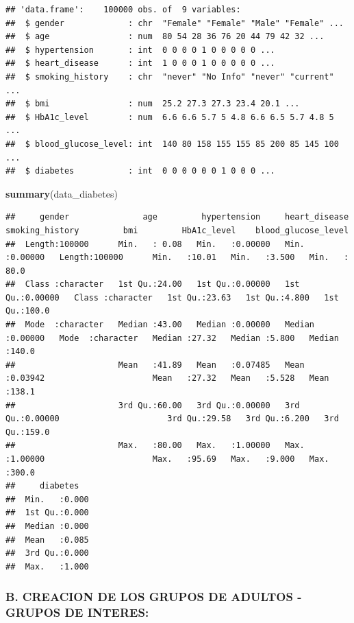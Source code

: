 \documentclass[
]{article}
\newenvironment{Shaded}{\begin{snugshade}}{\end{snugshade}}
\newcommand{\FunctionTok}[1]{\textcolor[rgb]{0.13,0.29,0.53}{\textbf{#1}}}
\newcommand{\NormalTok}[1]{#1}
\begin{document}
\begin{verbatim}
## 'data.frame':    100000 obs. of  9 variables:
##  $ gender             : chr  "Female" "Female" "Male" "Female" ...
##  $ age                : num  80 54 28 36 76 20 44 79 42 32 ...
##  $ hypertension       : int  0 0 0 0 1 0 0 0 0 0 ...
##  $ heart_disease      : int  1 0 0 0 1 0 0 0 0 0 ...
##  $ smoking_history    : chr  "never" "No Info" "never" "current" ...
##  $ bmi                : num  25.2 27.3 27.3 23.4 20.1 ...
##  $ HbA1c_level        : num  6.6 6.6 5.7 5 4.8 6.6 6.5 5.7 4.8 5 ...
##  $ blood_glucose_level: int  140 80 158 155 155 85 200 85 145 100 ...
##  $ diabetes           : int  0 0 0 0 0 0 1 0 0 0 ...
\end{verbatim}

\begin{Shaded}
\begin{Highlighting}[]
\FunctionTok{summary}\NormalTok{(data\_diabetes)}
\end{Highlighting}
\end{Shaded}

\begin{verbatim}
##     gender               age         hypertension     heart_disease     smoking_history         bmi         HbA1c_level    blood_glucose_level
##  Length:100000      Min.   : 0.08   Min.   :0.00000   Min.   :0.00000   Length:100000      Min.   :10.01   Min.   :3.500   Min.   : 80.0      
##  Class :character   1st Qu.:24.00   1st Qu.:0.00000   1st Qu.:0.00000   Class :character   1st Qu.:23.63   1st Qu.:4.800   1st Qu.:100.0      
##  Mode  :character   Median :43.00   Median :0.00000   Median :0.00000   Mode  :character   Median :27.32   Median :5.800   Median :140.0      
##                     Mean   :41.89   Mean   :0.07485   Mean   :0.03942                      Mean   :27.32   Mean   :5.528   Mean   :138.1      
##                     3rd Qu.:60.00   3rd Qu.:0.00000   3rd Qu.:0.00000                      3rd Qu.:29.58   3rd Qu.:6.200   3rd Qu.:159.0      
##                     Max.   :80.00   Max.   :1.00000   Max.   :1.00000                      Max.   :95.69   Max.   :9.000   Max.   :300.0      
##     diabetes    
##  Min.   :0.000  
##  1st Qu.:0.000  
##  Median :0.000  
##  Mean   :0.085  
##  3rd Qu.:0.000  
##  Max.   :1.000
\end{verbatim}

\hypertarget{b.-creacion-de-los-grupos-de-adultos---grupos-de-interes}{%
\subsubsection{\texorpdfstring{\textbf{B. CREACION DE LOS GRUPOS DE
ADULTOS - GRUPOS DE
INTERES:}}{B. CREACION DE LOS GRUPOS DE ADULTOS - GRUPOS DE INTERES:}}\label{b.-creacion-de-los-grupos-de-adultos---grupos-de-interes}}
\end{document}
